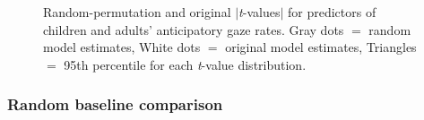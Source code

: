 \documentclass[authoryear, 12pt]{elsarticle}
\begin{document}
\begin{figure}[h!]
  \centering
  \hfill
  \caption{Random-permutation and original $|$\textit{t}-values$|$ for predictors of children and adults' anticipatory gaze rates. Gray dots $=$ random model estimates, White dots $=$ original model estimates, Triangles $=$ 95th percentile for each \textit{t}-value distribution.}
\end{figure}

\subsubsection{Random baseline comparison}
\label{sec:randbaseline2}
\end{document}
